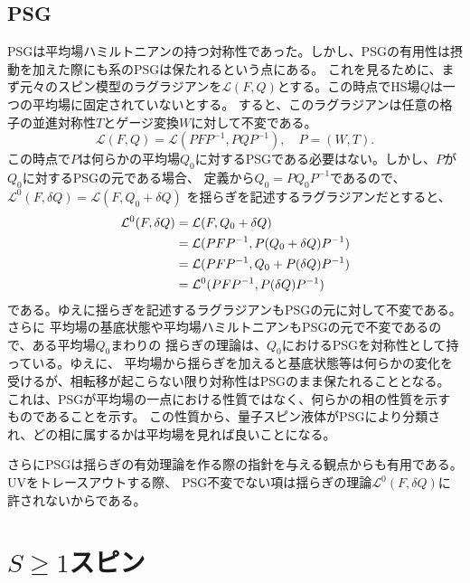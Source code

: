 \documentclass[11pt, aps, longbibliography]{article}
\begin{document}
    \subsection{PSG}
    PSGは平均場ハミルトニアンの持つ対称性であった。しかし、PSGの有用性は摂動を加えた際にも系のPSGは保たれるという点にある。
    これを見るために、まず元々のスピン模型のラグラジアンを$\mathcal{L}(F,Q)$とする。この時点でHS場$Q$は一つの平均場に固定されていないとする。
    すると、このラグラジアンは任意の格子の並進対称性$T$とゲージ変換$W$に対して不変である。
    \begin{equation}\label{eq:3-5-1}
        \mathcal{L}(F,Q) = \mathcal{L}(PFP^{-1},PQP^{-1}), \quad P=(W,T).
    \end{equation}
    この時点で$P$は何らかの平均場$Q_0$に対するPSGである必要はない。しかし、$P$が$Q_0$に対するPSGの元である場合、
    定義から$Q_0 = PQ_0P^{-1}$であるので、$\mathcal{L}^0(F,\delta Q) = \mathcal{L}(F,Q_0 + \delta Q)$
    を揺らぎを記述するラグラジアンだとすると、
    \begin{align}\label{eq:3-5-2}
        \mathcal{L}^0(F,\delta Q) &= \mathcal{L}(F, Q_0 + \delta Q) \notag \\
        &= \mathcal{L}(PFP^{-1}, P(Q_0 + \delta Q)P^{-1}) \notag \\
        &= \mathcal{L}(PFP^{-1}, Q_0 + P(\delta Q)P^{-1}) \notag \\
        &= \mathcal{L}^0(PFP^{-1}, P(\delta Q)P^{-1})
    \end{align}
    である。ゆえに揺らぎを記述するラグラジアンもPSGの元に対して不変である。さらに
    平均場の基底状態や平均場ハミルトニアンもPSGの元で不変であるので、ある平均場$Q_0$まわりの
    揺らぎの理論は、$Q_0$におけるPSGを対称性として持っている。ゆえに、
    平均場から揺らぎを加えると基底状態等は何らかの変化を受けるが、相転移が起こらない限り対称性はPSGのまま保たれることとなる。
    これは、PSGが平均場の一点における性質ではなく、何らかの相の性質を示すものであることを示す。
    この性質から、量子スピン液体がPSGにより分類され、どの相に属するかは平均場を見れば良いことになる。

    さらにPSGは揺らぎの有効理論を作る際の指針を与える観点からも有用である。UVをトレースアウトする際、
    PSG不変でない項は揺らぎの理論$\mathcal{L}^0(F, \delta Q)$に許されないからである。

\newpage 

\section{$S\geq1$スピン}\label{sec:higher-spin}
\end{document}
